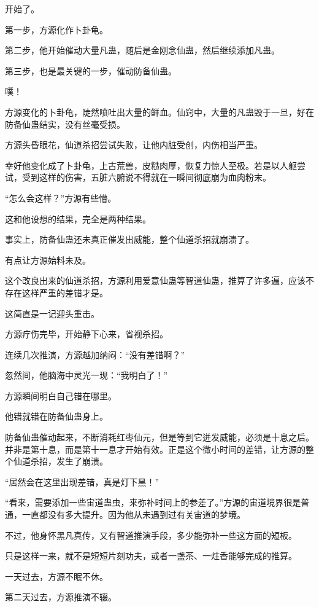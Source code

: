 
\begin{this_body}

开始了。

第一步，方源化作卜卦龟。

第二步，他开始催动大量凡蛊，随后是金刚念仙蛊，然后继续添加凡蛊。

第三步，也是最关键的一步，催动防备仙蛊。

噗！

方源变化的卜卦龟，陡然喷吐出大量的鲜血。仙窍中，大量的凡蛊毁于一旦，好在防备仙蛊结实，没有丝毫受损。

方源头昏眼花，仙道杀招尝试失败，让他内脏受创，内伤相当严重。

幸好他变化成了卜卦龟，上古荒兽，皮糙肉厚，恢复力惊人至极。若是以人躯尝试，受到这样的伤害，五脏六腑说不得就在一瞬间彻底崩为血肉粉末。

“怎么会这样？”方源有些懵。

这和他设想的结果，完全是两种结果。

事实上，防备仙蛊还未真正催发出威能，整个仙道杀招就崩溃了。

有点让方源始料未及。

这个改良出来的仙道杀招，方源利用爱意仙蛊等智道仙蛊，推算了许多遍，应该不存在这样严重的差错才是。

这简直是一记迎头重击。

方源疗伤完毕，开始静下心来，省视杀招。

连续几次推演，方源越加纳闷：“没有差错啊？”

忽然间，他脑海中灵光一现：“我明白了！”

方源瞬间明白自己错在哪里。

他错就错在防备仙蛊身上。

防备仙蛊催动起来，不断消耗红枣仙元，但是等到它迸发威能，必须是十息之后。并非是第十息，而是第十一息才开始有效。正是这个微小时间的差错，让方源的整个仙道杀招，发生了崩溃。

“居然会在这里出现差错，真是灯下黑！”

“看来，需要添加一些宙道蛊虫，来弥补时间上的参差了。”方源的宙道境界很是普通，一直都没有多大提升。因为他从未遇到过有关宙道的梦境。

不过，他身怀黑凡真传，又有智道推演手段，多少能弥补一些这方面的短板。

只是这样一来，就不是短短片刻功夫，或者一盏茶、一炷香能够完成的推算。

一天过去，方源不眠不休。

第二天过去，方源推演不辍。


\end{this_body}
